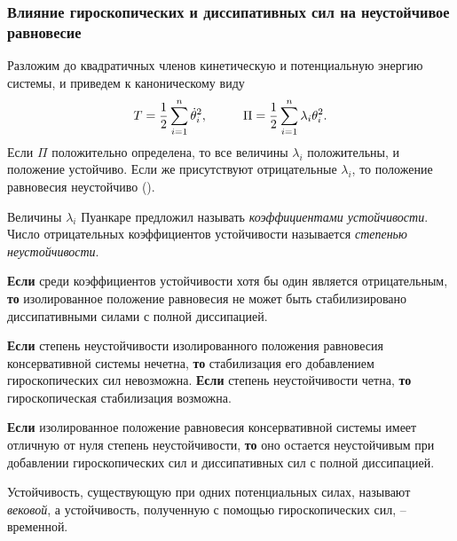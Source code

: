 \subsubsection*{Влияние гироскопических и диссипативных сил на
неустойчивое равновесие}

Разложим до квадратичных членов кинетическую и потенциальную энергию системы, и приведем к каноническому виду
\begin{equation*}
    T = \frac{1}{2}\sum_{i=1}^n \dot{\theta}_i^2,
    \hspace{1 cm}
    \Pi = \frac{1}{2} \sum_{i=1}^{n} \lambda_i \theta_i^2.
\end{equation*}
Если $\Pi$ положительно определена, то все величины $\lambda_i$ положительны, и положение устойчиво. Если же присутствуют отрицательные $\lambda_i$, то положение равновесия неустойчиво (). 

\begin{to_def}
    Величины $\lambda_i$ Пуанкаре предложил называть \textit{коэффициентами устойчивости}. Число отрицательных коэффициентов устойчивости называется \textit{степенью неустойчивости}. 
\end{to_def}


\begin{to_thr}[]
    \textbf{Если} среди коэффициентов устойчивости хотя бы один является отрицательным, \textbf{то} изолированное положение равновесия не может быть стабилизировано диссипативными силами с полной диссипацией.
\end{to_thr}

\begin{to_thr}[]
    \textbf{Если} степень неустойчивости изолированного положения равновесия консервативной системы нечетна, \textbf{то} стабилизация его добавлением гироскопических сил невозможна. \textbf{Если} степень неустойчивости четна, \textbf{то} гироскопическая стабилизация возможна.
\end{to_thr}

\begin{to_thr}[]
    \textbf{Если} изолированное положение равновесия консервативной системы имеет отличную от нуля степень неустойчивости, \textbf{то} оно остается неустойчивым при добавлении гироскопических сил и диссипативных сил с полной диссипацией.
\end{to_thr}

\begin{to_def}
    Устойчивость, существующую при одних потенциальных силах, называют \textit{вековой}, а устойчивость, полученную с помощью гироскопических сил, -- временной.
\end{to_def}